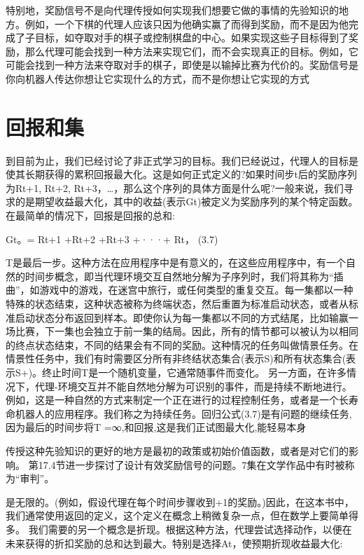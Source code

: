 特别地，奖励信号不是向代理传授如何实现我们想要它做的事情的先验知识的地方。例如，一个下棋的代理人应该只因为他确实赢了而得到奖励，而不是因为他完成了子目标，如夺取对手的棋子或控制棋盘的中心。如果实现这些子目标得到了奖励，那么代理可能会找到一种方法来实现它们，而不会实现真正的目标。例如，它可能会找到一种方法来夺取对手的棋子，即使是以输掉比赛为代价的。奖励信号是你向机器人传达你想让它实现什么的方式，而不是你想让它实现的方式


\section{回报和集}

到目前为止，我们已经讨论了非正式学习的目标。我们已经说过，代理人的目标是使其长期获得的累积回报最大化。这是如何正式定义的?如果时间步t后的奖励序列为Rt+1, Rt+2, Rt+3，…，那么这个序列的具体方面是什么呢?一般来说，我们寻求的是期望收益最大化，其中的收益(表示Gt)被定义为奖励序列的某个特定函数。在最简单的情况下，回报是回报的总和:

Gt。= Rt+1 +Rt+2 +Rt+3 +···+ Rt， 					(3.7)

T是最后一步。这种方法在应用程序中是有意义的，在这些应用程序中，有一个自然的时间步概念，即当代理环境交互自然地分解为子序列时，我们将其称为“插曲”，如游戏中的游戏，在迷宫中旅行，或任何类型的重复交互。每一集都以一种特殊的状态结束，这种状态被称为终端状态，然后重置为标准启动状态，或者从标准启动状态分布返回到样本。即使你认为每一集都以不同的方式结尾，比如输赢一场比赛，下一集也会独立于前一集的结局。因此，所有的情节都可以被认为以相同的终点状态结束，不同的结果会有不同的奖励。这种情况的任务叫做情景任务。在情景性任务中，我们有时需要区分所有非终结状态集合(表示S)和所有状态集合(表示S+)。终止时间T是一个随机变量，它通常随事件而变化。
另一方面，在许多情况下，代理-环境交互并不能自然地分解为可识别的事件，而是持续不断地进行。例如，这是一种自然的方式来制定一个正在进行的过程控制任务，或者是一个长寿命机器人的应用程序。我们称之为持续任务。回归公式(3.7)是有问题的继续任务,因为最后的时间步将T =∞,和回报,这是我们正试图最大化,能轻易本身

传授这种先验知识的更好的地方是最初的政策或初始价值函数，或者是对它们的影响。
第17.4节进一步探讨了设计有效奖励信号的问题。7集在文学作品中有时被称为“审判”。

是无限的。(例如，假设代理在每个时间步骤收到+1的奖励。)因此，在这本书中，我们通常使用返回的定义，这个定义在概念上稍微复杂一点，但在数学上要简单得多。
我们需要的另一个概念是折现。根据这种方法，代理尝试选择动作，以便在未来获得的折扣奖励的总和达到最大。特别是选择At，使预期折现收益最大化:



